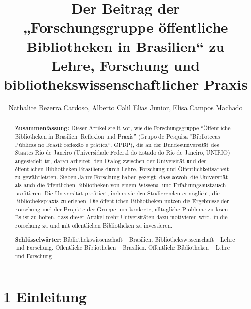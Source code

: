 \documentclass[a4paper,
fontsize=11pt,
oneside,
numbers=noperiodatend,
parskip=half-,
bibliography=totoc,
final
]{scrartcl}
\title{\LARGE{Der Beitrag der „Forschungsgruppe öffentliche Bibliotheken in Brasilien“ zu Lehre, Forschung und bibliothekswissenschaftlicher Praxis}}%
\author{Nathalice Bezerra Cardoso, Alberto Calil Elias Junior, Elisa Campos Machado} %
\date{}
\begin{document}
\maketitle
\thispagestyle{fancyplain} 

\begin{abstract}
\noindent
\textbf{Zusammenfassung:} Dieser Artikel stellt vor, wie die
Forschungsgruppe ``Öffentliche Bibliotheken in Brasilien: Reflexion und
Praxis'' (Grupo de Pesquisa ``Bibliotecas Públicas no Brasil: reflexão e
prática'', GPBP), die an der Bundesuniversität des Staates Rio de
Janeiro (Universidade Federal do Estado do Rio de Janeiro, UNIRIO)
angesiedelt ist, daran arbeitet, den Dialog zwischen der Universität und
den öffentlichen Bibliotheken Brasiliens durch Lehre, Forschung und
Öffentlichkeitsarbeit zu gewährleisten. Sieben Jahre Forschung haben
gezeigt, dass sowohl die Universität als auch die öffentlichen
Bibliotheken von einem Wissens- und Erfahrungsaustausch profitieren. Die
Universität profitiert, indem sie den Studierenden ermöglicht, die
Bibliothekspraxis zu erleben. Die öffentlichen Bibliotheken nutzen die
Ergebnisse der Forschung und der Projekte der Gruppe, um konkrete,
alltägliche Probleme zu lösen. Es ist zu hoffen, dass dieser Artikel
mehr Universitäten dazu motivieren wird, in die Forschung zu und mit
öffentlichen Bibliotheken zu investieren.

\noindent \textbf{Schlüsselwörter:} Bibliothekswissenschaft -- Brasilien.
Bibliothekswissenschaft -- Lehre und Forschung. Öffentliche Bibliotheken
-- Brasilien. Öffentliche Bibliotheken -- Lehre und Forschung
\end{abstract}

\hypertarget{einleitung}{%
\section{1 Einleitung}\label{einleitung}}
\end{document}
